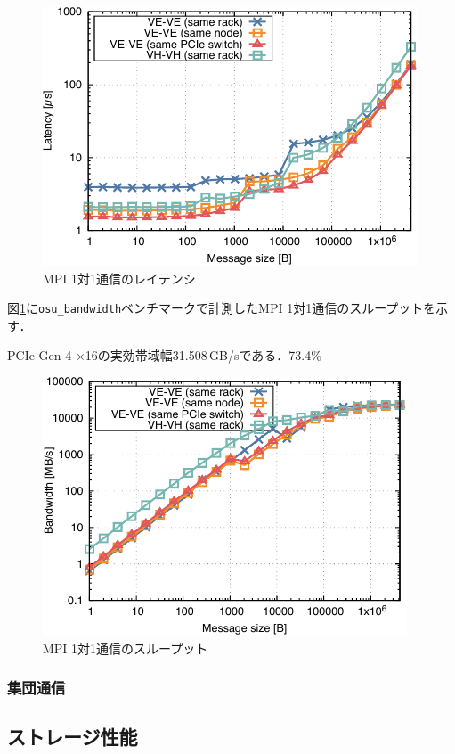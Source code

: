 ﻿\documentclass[submit,techrep,noauthor]{ipsj}
\begin{document}
\begin{figure}
  \centering
  \includegraphics{figs/mpi_latency.pdf}
  \caption{MPI 1対1通信のレイテンシ}\label{fig:mpi-lat}
\end{figure}

図\ref{fig:mpi-lat}に\verb|osu_bandwidth|ベンチマークで計測したMPI 1対1通信のスループットを示す．

PCIe Gen 4 $\times$16の実効帯域幅31.508\,GB/sである．73.4\%

\begin{figure}
  \centering
  \includegraphics{figs/mpi_bandwidth.pdf}
  \caption{MPI 1対1通信のスループット}\label{fig:bw}
\end{figure}

\subsubsection{集団通信}

\subsection{ストレージ性能}
\end{document}
